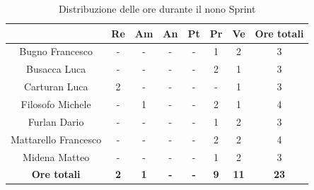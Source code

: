 \begin{table}[H]
  \centering
  \renewcommand{\arraystretch}{1.8}
  \begin{tabular}{c|c|c|c|c|c|c|c}
    \rowcolor[HTML]{125E28}
    \multicolumn{1}{c}{\color[HTML]{FFFFFF}\textbf{ Nominativo }}
                         & \multicolumn{1}{c}{\color[HTML]{FFFFFF}\textbf{ Re }}
                         & \multicolumn{1}{c}{\color[HTML]{FFFFFF}\textbf{ Am}}
                         & \multicolumn{1}{c}{\color[HTML]{FFFFFF}\textbf{ An }}
                         & \multicolumn{1}{c}{\color[HTML]{FFFFFF}\textbf{ Pt }}
                         & \multicolumn{1}{c}{\color[HTML]{FFFFFF}\textbf{ Pr }}
                         & \multicolumn{1}{c}{\color[HTML]{FFFFFF}\textbf{ Ve }}
                         & \multicolumn{1}{c}{\color[HTML]{FFFFFF}\textbf{ Ore totali }}                                                                                 \\
    \hline
    Bugno Francesco      & -                                                             & -          & -          & -          & 1          & 2           & 3           \\
    Busacca Luca         & -                                                             & -          & -          & -          & 2          & 1           & 3           \\
    Carturan Luca        & 2                                                             & -          & -          & -          & -          & 1           & 3           \\
    Filosofo Michele     & -                                                             & 1          & -          & -          & 2          & 1           & 4           \\
    Furlan Dario         & -                                                             & -          & -          & -          & 1          & 2           & 3           \\
    Mattarello Francesco & -                                                             & -          & -          & -          & 2          & 2           & 4           \\
    Midena Matteo        & -                                                             & -          & -          & -          & 1          & 2           & 3           \\
    \textbf{Ore totali}  & \textbf{2}                                                    & \textbf{1} & \textbf{-} & \textbf{-} & \textbf{9} & \textbf{11} & \textbf{23}
  \end{tabular}
  \caption{Distribuzione delle ore durante il nono Sprint}
\end{table}

